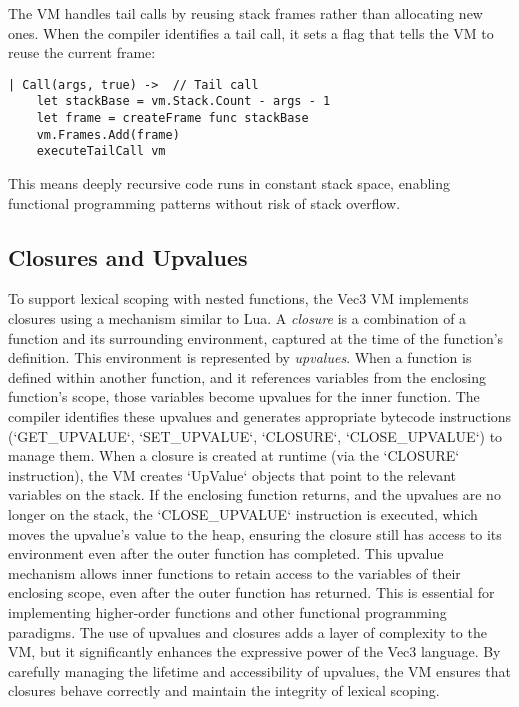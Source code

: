 The VM handles tail calls by reusing stack frames rather than allocating new ones. When the compiler identifies a tail call, it sets a flag that tells the VM to reuse the current frame:

\begin{verbatim}
| Call(args, true) ->  // Tail call
    let stackBase = vm.Stack.Count - args - 1
    let frame = createFrame func stackBase
    vm.Frames.Add(frame)
    executeTailCall vm
\end{verbatim}
This means deeply recursive code runs in constant stack space, enabling functional programming patterns without risk of stack overflow.

\subsection{Closures and Upvalues}
To support lexical scoping with nested functions, the Vec3 VM implements closures using a mechanism similar to Lua. A \textit{closure} is a combination of a function and its surrounding environment, captured at the time of the function's definition. This environment is represented by \textit{upvalues}.
When a function is defined within another function, and it references variables from the enclosing function's scope, those variables become upvalues for the inner function.  The compiler identifies these upvalues and generates appropriate bytecode instructions (`GET_UPVALUE`, `SET_UPVALUE`, `CLOSURE`, `CLOSE_UPVALUE`) to manage them.
When a closure is created at runtime (via the `CLOSURE` instruction), the VM creates `UpValue` objects that point to the relevant variables on the stack. If the enclosing function returns, and the upvalues are no longer on the stack, the `CLOSE_UPVALUE` instruction is executed, which moves the upvalue's value to the heap, ensuring the closure still has access to its environment even after the outer function has completed.
This upvalue mechanism allows inner functions to retain access to the variables of their enclosing scope, even after the outer function has returned. This is essential for implementing higher-order functions and other functional programming paradigms. The use of upvalues and closures adds a layer of complexity to the VM, but it significantly enhances the expressive power of the Vec3 language. By carefully managing the lifetime and accessibility of upvalues, the VM ensures that closures behave correctly and maintain the integrity of lexical scoping.

